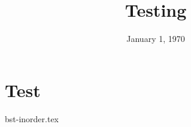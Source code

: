 \documentclass[11pt]{exam}
\title{Testing}
\date{January 1, 1970}
\begin{document}
\maketitle

\section{Test}


\begin{questions}
    {bst-inorder.tex}
\end{questions}
\newpage



\end{document}
